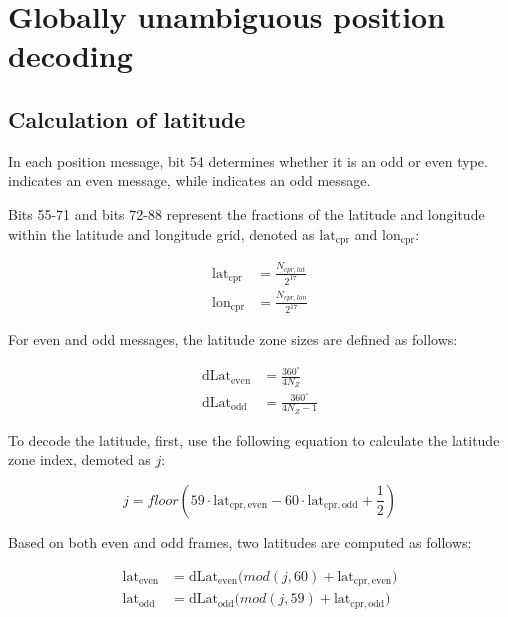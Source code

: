 \section{Globally unambiguous position decoding} 

\subsection{Calculation of latitude} \label{sec:cpr_airborne_global_lat}

In each position message, bit 54 determines whether it is an odd or even type. \0 indicates an even message, while \1 indicates an odd message.

Bits 55-71 and bits 72-88 represent the fractions of the latitude and longitude within the latitude and longitude grid, denoted as $\mathrm{lat}_\mathrm{cpr}$ and $\mathrm{lon}_\mathrm{cpr}$:

\begin{equation}
  \begin{split}
      \mathrm{lat}_\mathrm{cpr} &= \frac{N_{cpr,lat}}{2^{17}} \\
    \mathrm{lon}_\mathrm{cpr} &= \frac{N_{cpr,lon}}{2^{17}}
  \end{split}
\end{equation}


For even and odd messages, the latitude zone sizes are defined as follows:

\begin{equation}
\begin{split}
  \mathrm{dLat}_\mathrm{even} &= \frac{360^\circ}{4 N_Z} \\
  \mathrm{dLat}_\mathrm{odd} &= \frac{360^\circ}{4 N_Z - 1}
\end{split}
\end{equation}


To decode the latitude, first, use the following equation to calculate the latitude zone index, demoted as $j$:

\begin{equation}
  j = floor \left( 59 \cdot \mathrm{lat}_\mathrm{cpr, even} - 60 \cdot \mathrm{lat}_\mathrm{cpr,odd} + \frac{1}{2}  \right)
\end{equation}


Based on both even and odd frames, two latitudes are computed as follows:

\begin{equation}
  \begin{split}
    \mathrm{lat}_\mathrm{even} &= \mathrm{dLat}_\mathrm{even} \Big( mod(j, 60) + \mathrm{lat}_\mathrm{cpr, even} \Big) \\
    \mathrm{lat}_\mathrm{odd} &= \mathrm{dLat}_\mathrm{odd} \Big( mod(j, 59) + \mathrm{lat}_\mathrm{cpr,odd} \Big)
  \end{split}
\end{equation}


